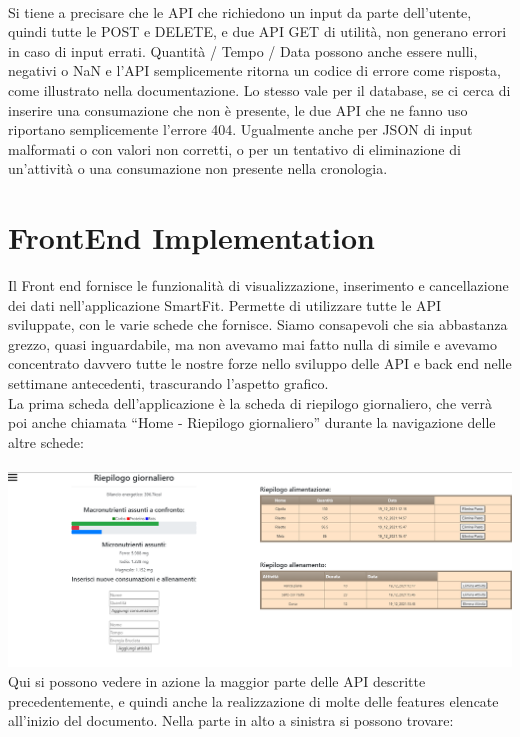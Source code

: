 \documentclass{article}
\begin{document}
   \\
   Si tiene a precisare che le API che richiedono un input da parte dell’utente, quindi tutte le POST e DELETE, e due API GET di utilità, non generano errori in caso di input errati. Quantità / Tempo / Data possono anche essere nulli, negativi o NaN e l’API semplicemente ritorna un codice di errore come risposta, come illustrato nella documentazione. Lo stesso vale per il database, se ci cerca di inserire una consumazione che non è presente, le due API che ne fanno uso riportano semplicemente l’errore 404. Ugualmente anche per JSON di input malformati o con valori non corretti, o per un tentativo di eliminazione di un’attività o una consumazione non presente nella cronologia.\\
   \section{FrontEnd Implementation}
   Il Front end fornisce le funzionalità di visualizzazione, inserimento e cancellazione dei dati nell’applicazione SmartFit. Permette di utilizzare tutte le API sviluppate, con le varie schede che fornisce. Siamo consapevoli che sia abbastanza grezzo, quasi inguardabile, ma non avevamo mai fatto nulla di simile e avevamo concentrato davvero tutte le nostre forze nello sviluppo delle API e back end nelle settimane antecedenti, trascurando l’aspetto grafico.\\
   La prima scheda dell’applicazione è la scheda di riepilogo giornaliero, che verrà poi anche chiamata “Home - Riepilogo giornaliero” durante la navigazione delle altre schede:\\
   \\
   \includegraphics[scale=0.35]{riepilogo.png}\\
   Qui si possono vedere in azione la maggior parte delle API descritte precedentemente, e quindi anche la realizzazione di molte delle features elencate all’inizio del documento.
   Nella parte in alto a sinistra si possono trovare:
\end{document}
